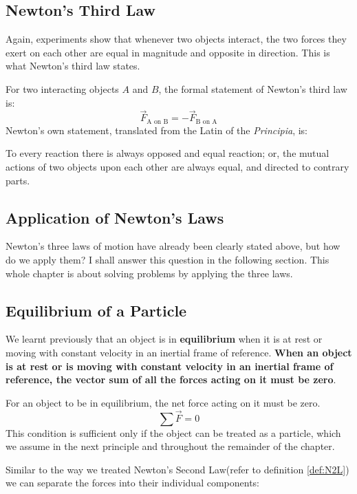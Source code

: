 \subsection{Newton's Third Law}
Again, experiments show that whenever two objects interact, the two forces they exert on each other are equal in magnitude and opposite in direction. This is what Newton's third law states.

\begin{defi}
For two interacting objects $A$ and $B$, the formal statement of Newton's third law is:
$$\vec{F}_{\text{A on B}} = - \vec{F}_{\text{B on A}}$$
Newton's own statement, translated from the Latin of the \emph{Principia}, is:

To every reaction there is always opposed and equal reaction; or, the mutual actions of two objects upon each other are always equal, and directed to contrary parts.
\end{defi}

\subsection{Application of Newton's Laws}
Newton's three laws of motion have already been clearly stated above, but how do we apply them? I shall answer this question in the following section. This whole chapter is about solving problems by applying the three laws.

\subsection{Equilibrium of a Particle}
We learnt previously that an object is in \textbf{equilibrium} when it is at rest or moving with constant velocity in an inertial frame of reference. \textbf{When an object is at rest or is moving with constant velocity in an inertial frame of reference, the vector sum of all the forces acting on it must be zero}.

\begin{form}
For an object to be in equilibrium, the net force acting on it must be zero.
$$\sum \vec{F} = 0$$
This condition is sufficient only if the object can be treated as a particle, which we assume in the next principle and throughout the remainder of the chapter.
\end{form}

Similar to the way we treated Newton's Second Law(refer to definition \ref{def:N2L}) we can separate the forces into their individual components:

